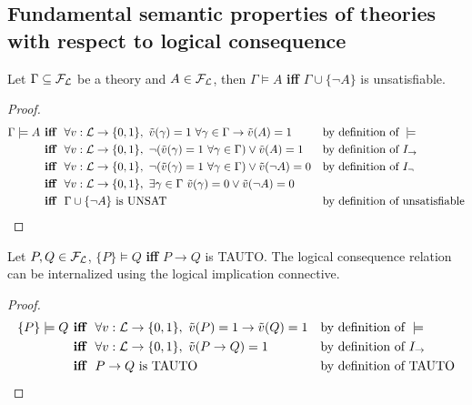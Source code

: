 	\subsection{Fundamental semantic properties of theories with respect to logical consequence}

	\begin{lemma}\label{lem:lemmunsat}
	Let $\Gamma \subseteq \mathcal{F}_\mathcal{L}$ be a theory and $A \in \mathcal{F}_\mathcal{L}$, then $\Gamma \models A$ \textbf{iff} $\Gamma \cup \{\neg A\}$ is unsatisfiable.
	\end{lemma}
	\begin{proof}
	  	\begin{align*}
		  \Gamma \models A &\textbf{ iff } \ \forall \ta, \ \tilde{v} (\gamma) = 1 \ \forall \gamma \in \Gamma \rightarrow \tilde{v} (A) = 1 & & \text{by definition of } \models \\
		  &\textbf{ iff } \ \forall \ta, \ \neg (\tilde{v} (\gamma) = 1 \ \forall \gamma \in \Gamma) \vee \tilde{v} (A) = 1 & & \text{by definition of } I_\rightarrow \\
		  &\textbf{ iff } \ \forall \ta, \ \neg ( \tilde{v} (\gamma) = 1 \ \forall \gamma \in \Gamma) \vee \tilde{v} (\neg A) = 0 & & \text{by definition of } I_\neg \\
		  &\textbf{ iff } \ \forall \ta, \ \exists \gamma \in \Gamma \ \tilde{v} (\gamma) = 0 \vee \tilde{v} (\neg A) = 0 & &  \\
		  &\textbf{ iff } \ \Gamma \cup \{\neg A\} \text{ is UNSAT } & & \text{by definition of unsatisfiable}
		\end{align*}
	\end{proof}

	\begin{lemma} Let $P,Q \in \mathcal{F}_\mathcal{L}$, $\{P\} \models Q$ \textbf{iff} $P \rightarrow Q$ is TAUTO.  The logical consequence relation can be internalized using the logical implication connective.
	\end{lemma}
	\begin{proof}
	  	  	\begin{align*}
		  \{P\} \models Q &\textbf{ iff } \ \forall v: \mathcal{L} \rightarrow \{0,1\}, \ \tilde{v} (P) = 1 \rightarrow \tilde{v} (Q) = 1 & & \text{by definition of } \models \\
		  &\textbf{ iff } \ \forall v: \mathcal{L} \rightarrow \{0,1\}, \ \tilde{v} (P \rightarrow Q) = 1 & & \text{by definition of } I_\rightarrow \\
		  &\textbf{ iff } \ P \rightarrow Q \text{ is TAUTO } & & \text{by definition of TAUTO}
		\end{align*}
	\end{proof}

